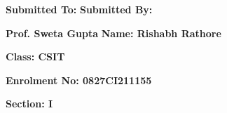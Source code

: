 \documentclass[12pt,,a4paper]{article}
\begin{document}







\vspace*{2cm}

\textbf{\fontsize{14}{\baselineskip}\selectfont Submitted To:} 
 \hspace{\fill} 
\textbf{\fontsize{14}{\baselineskip}\selectfont Submitted By:} 


\bigskip

\textbf{\fontsize{14}{\baselineskip}\selectfont Prof. Sweta Gupta}
\hspace{\fill}
\textbf{\fontsize{14}{\baselineskip}\selectfont Name: Rishabh Rathore }

\bigskip

\hspace{8cm}\textbf{\fontsize{14}{\baselineskip}\selectfont Class: CSIT}

\bigskip


\hspace{8cm}\textbf{\fontsize{14}{\baselineskip}\selectfont Enrolment No: 0827CI211155}

\bigskip

\hspace{8cm}\textbf{\fontsize{14}{\baselineskip}\selectfont Section: I}

\clearpage

\end{document}
